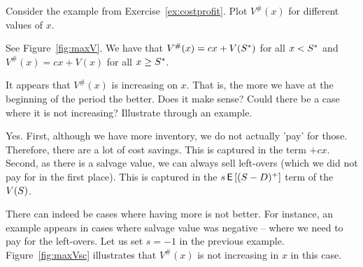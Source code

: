 
\begin{exercise}
Consider the example from Exercise~\ref{ex:costprofit}. Plot $V^\#(x)$ for different values of $x$. 


\begin{solution}
See Figure~\ref{fig:maxV}.  We have that $V^\#(x)=cx+V(S^*)$ for all $x<S^*$ and $V^\#(x)=cx+V(x)$ for all $x\geq S^*$.
\end{solution}
\end{exercise}

\begin{exercise}
It appears that $V^\#(x)$ is increasing on $x$. That is, the more we have at the beginning of the period the better. Does it make sense? Could there be a case where it is not increasing? Illustrate through an example.


\begin{solution}
Yes. First, although we have more inventory, we do not actually 'pay' for those. Therefore, there are a lot of cost savings. This is captured in the term $+cx$. Second, as there is a salvage value, we can always sell left-overs (which we did not pay for in the first place). This is captured in the $s\,\mathsf{E}\left[(S-D)^+\right]$ term of the $V(S)$. 

There can indeed be cases where having more is not better. For instance, an example appears in cases where salvage value was negative -- where we need to pay for the left-overs. Let us set $s=-1$ in the previous example. Figure~\ref{fig:maxVsc} illustrates that $V^\#(x)$ is not increasing in $x$ in this case. 
\end{solution}
\end{exercise}

